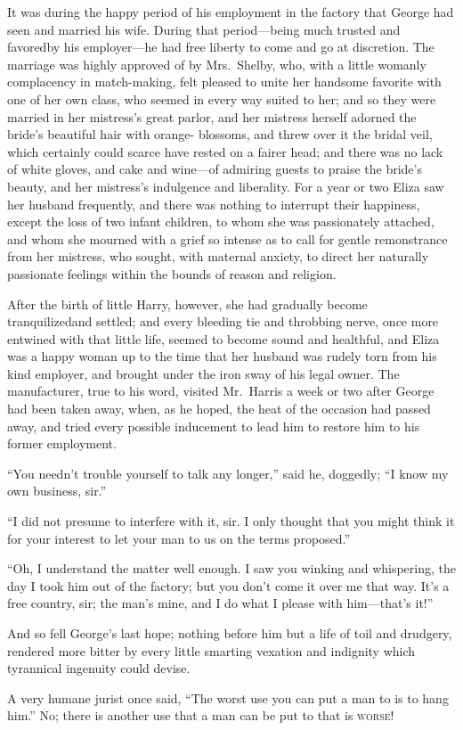 It was during the happy period of his employment in the factory that George had
seen and married his wife. During that period---being much trusted and
favored\msc by his employer---he had free liberty to come and go at discretion.
The marriage was highly approved of by Mrs.\ Shelby, who, with a little womanly
complacency in match-making, felt pleased to unite her handsome favorite\msc
with one of her own class, who seemed in every way suited to her; and so they
were married in her mistress's great parlor\msc, and her mistress herself
adorned the bride's beautiful hair with orange- blossoms, and threw over it the
bridal veil, which certainly could scarce have rested on a fairer head; and
there was no lack of white gloves, and cake and wine---of admiring guests to
praise the bride's beauty, and her mistress's indulgence and liberality. For
a year or two Eliza saw her husband frequently, and there was nothing to
interrupt their happiness, except the loss of two infant children, to whom she
was passionately attached, and whom she mourned with a grief so intense as to
call for gentle remonstrance from her mistress, who sought, with maternal
anxiety, to direct her naturally passionate feelings within the bounds of reason
and religion.

After the birth of little Harry, however, she had gradually become
tranquilized\msc and settled; and every bleeding tie and throbbing nerve, once
more entwined with that little life, seemed to become sound and healthful, and
Eliza was a happy woman up to the time that her husband was rudely torn from his
kind employer, and brought under the iron sway of his legal owner. The
manufacturer, true to his word, visited Mr.\ Harris a week or two after George
had been taken away, when, as he hoped, the heat of the occasion had passed
away, and tried every possible inducement to lead him to restore him to his
former employment.

``You needn't trouble yourself to talk any longer,'' said he, doggedly; ``I know
my own business, sir.''

``I did not presume to interfere with it, sir. I only thought that you might
think it for your interest to let your man to us on the terms proposed.''

``Oh, I understand the matter well enough. I saw you winking and whispering, the
day I took him out of the factory; but you don't come it over me that way. It's
a free country, sir; the man's mine, and I do what I please with him---that's
it!''

And so fell George's last hope; nothing before him but a life of toil and
drudgery, rendered more bitter by every little smarting vexation and indignity
which tyrannical ingenuity could devise.

A very humane jurist once said, ``The worst use you can put a man to is to hang
him.'' No; there is another use that a man can be put to that is \textsc{worse}!

